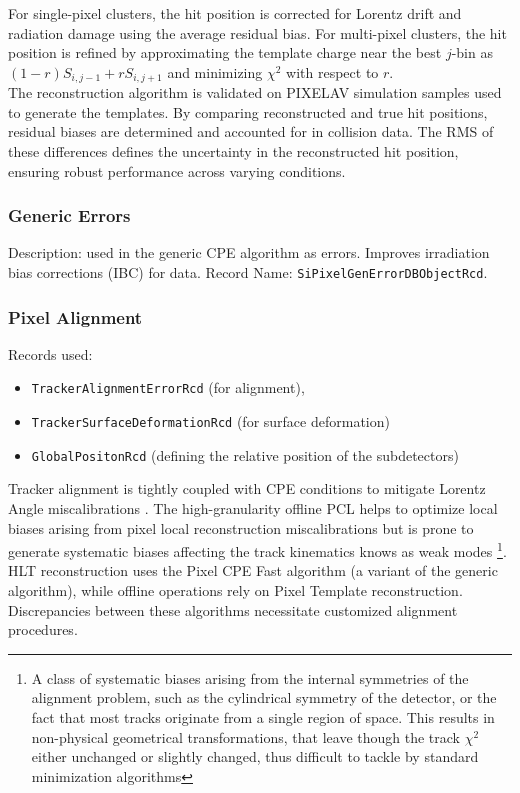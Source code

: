 For single-pixel clusters, the hit position is corrected for Lorentz drift and radiation damage using the average residual bias. For multi-pixel clusters, the hit position is refined by approximating the template charge near the best \(j\)-bin as \((1-r)S_{i,j-1} + rS_{i,j+1}\) and minimizing \(\chi^2\) with respect to \(r\).\\
The reconstruction algorithm is validated on PIXELAV simulation samples used to generate the templates. By comparing reconstructed and true hit positions, residual biases are determined and accounted for in collision data. The RMS of these differences defines the uncertainty in the reconstructed hit position, ensuring robust performance across varying conditions.

\subsubsection{Generic Errors}

Description: used in the generic CPE algorithm as errors. Improves irradiation bias corrections (IBC) for data.
Record Name:  \texttt{SiPixelGenErrorDBObjectRcd}.

\subsubsection{Pixel Alignment}
Records used: 
\begin{itemize}
\item \texttt{TrackerAlignmentErrorRcd} (for alignment), 
\item \texttt{TrackerSurfaceDeformationRcd} (for surface deformation)  \item \texttt{GlobalPositonRcd} (defining the relative position of the subdetectors) 
\end{itemize}

Tracker alignment is tightly coupled with CPE conditions to mitigate Lorentz Angle miscalibrations \cite{CMS:2022ali}. The high-granularity offline PCL helps to optimize local biases arising from pixel local reconstruction miscalibrations but is prone to generate systematic biases affecting the track kinematics knows as weak modes \footnote{A class of systematic biases arising from the internal symmetries of the alignment problem, such as the cylindrical symmetry of the detector, or the fact that most tracks originate from a single region of space. This results in non-physical geometrical transformations, that leave though the track $\chi^{2}$ either unchanged or slightly changed, thus difficult to tackle by standard minimization algorithms}.
HLT reconstruction uses the Pixel CPE Fast algorithm (a variant of the generic algorithm), while offline operations rely on Pixel Template reconstruction. Discrepancies between these algorithms necessitate customized alignment procedures.


